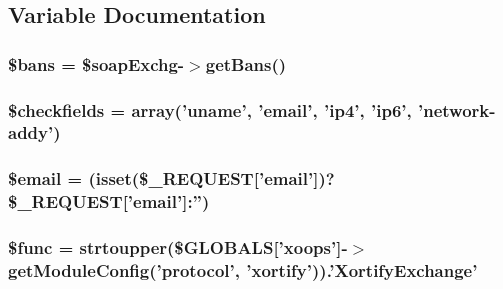 \subsection{Variable Documentation}
\hypertarget{xortify_2post_8loader_8php_a4e486549b335a8e8fe6eeb9c4aa0a17c}{
\subsubsection[{\$bans}]{\setlength{\rightskip}{0pt plus 5cm}\$bans = \$soap\-Exchg-\/$>$get\-Bans()}}\label{xortify_2post_8loader_8php_a4e486549b335a8e8fe6eeb9c4aa0a17c}
\hypertarget{xortify_2post_8loader_8php_afaeb0aa23d13e417fcfa6b008f397c71}{
\subsubsection[{\$checkfields}]{\setlength{\rightskip}{0pt plus 5cm}\$checkfields = array('uname', 'email', 'ip4', 'ip6', 'network-\/addy')}}\label{xortify_2post_8loader_8php_afaeb0aa23d13e417fcfa6b008f397c71}
\hypertarget{xortify_2post_8loader_8php_ad634f418b20382e2802f80532d76d3cd}{
\subsubsection[{\$email}]{\setlength{\rightskip}{0pt plus 5cm}\$email = (isset(\$\-\_\-\-R\-E\-Q\-U\-E\-S\-T\mbox{[}'email'\mbox{]})?\$\-\_\-\-R\-E\-Q\-U\-E\-S\-T\mbox{[}'email'\mbox{]}\-:'')}}\label{xortify_2post_8loader_8php_ad634f418b20382e2802f80532d76d3cd}
\hypertarget{xortify_2post_8loader_8php_aacfa30e81347998f3a6fd1903c2c05d3}{
\subsubsection[{\$func}]{\setlength{\rightskip}{0pt plus 5cm}\$func = strtoupper(\$G\-L\-O\-B\-A\-L\-S\mbox{[}'xoops'\mbox{]}-\/$>$get\-Module\-Config('protocol', 'xortify')).'Xortify\-Exchange'}}\label{xortify_2post_8loader_8php_aacfa30e81347998f3a6fd1903c2c05d3}
